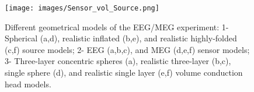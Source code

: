 \begin{figure}[!b]
\centering
\texttt{[image: images/Sensor\_vol\_Source.png]} %
\centering
\caption{Different geometrical models of the EEG/MEG experiment: 1- Spherical (a,d), realistic inflated (b,e), and realistic highly-folded (c,f) source models; 2- EEG (a,b,c), and MEG (d,e,f) sensor models; 3- Three-layer concentric spheres (a), realistic three-layer (b,c), single sphere (d), and realistic single layer (e,f) volume conduction head models.}
\label{fig:Sensor_vol_Source}
\end{figure}